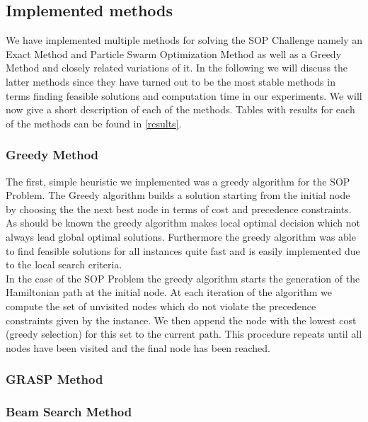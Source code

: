 \documentclass[]{article}
\begin{document}
    \subsection{Implemented methods}

    We have implemented multiple methods for solving the SOP Challenge namely an Exact Method and Particle Swarm Optimization Method as well as a Greedy Method and closely related variations of it. In the following we will discuss the latter methods since they have turned out to be the most stable methods in terms finding feasible solutions and computation time in our experiments. We will now give a short description of each of the methods. Tables with results for each of the methods can be found in \ref{results}.

    \subsubsection{Greedy Method}

   	The first, simple heuristic we implemented was a greedy algorithm for the SOP Problem. The Greedy algorithm builds a solution starting from the initial node by choosing the the next best node in terms of cost and precedence constraints. As should be known the greedy algorithm makes local optimal decision which not always lead global optimal solutions. Furthermore the greedy algorithm was able to find feasible solutions for all instances quite fast and is easily implemented due to the local search criteria. \cite{Cormen2009} \\

   	In the case of the SOP Problem the greedy algorithm starts the generation of the Hamiltonian path at the initial node. At each iteration of the algorithm we compute the set of unvisited nodes which do not violate the precedence constraints given by the instance. We then append the node with the lowest cost (greedy selection) for this set to the current path. This procedure repeats until all nodes have been visited and the final node has been reached.

    \subsubsection{GRASP Method}


    \subsubsection{Beam Search Method}
\end{document}
